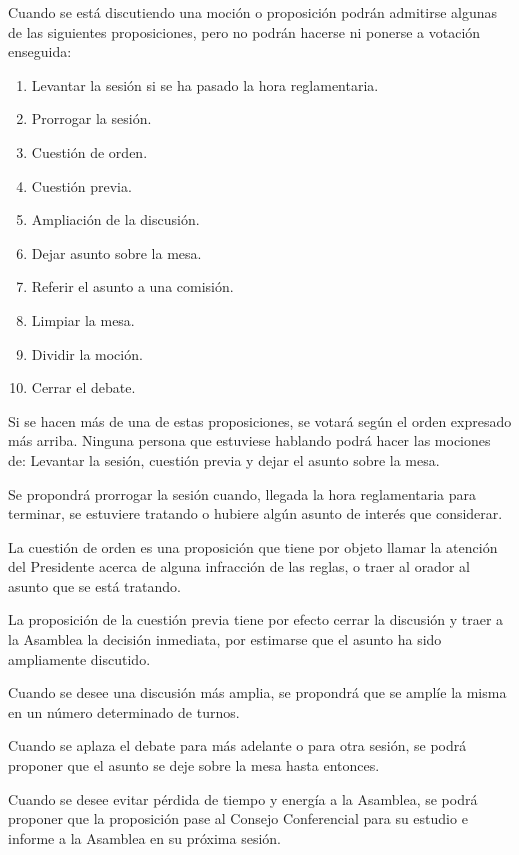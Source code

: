 \article
Cuando se está discutiendo una moción o proposición podrán admitirse algunas de las siguientes proposiciones, pero no podrán hacerse ni ponerse a votación enseguida:
\begin{enumerate}[label=\alph*),noitemsep]
    \item Levantar la sesión si se ha pasado la hora reglamentaria.
    \item Prorrogar la sesión.
    \item Cuestión de orden.
    \item Cuestión previa.
    \item Ampliación de la discusión.
    \item Dejar asunto sobre la mesa.
    \item Referir el asunto a una comisión.
    \item Limpiar la mesa.
    \item Dividir la moción.
    \item Cerrar el debate.
\end{enumerate}
Si se hacen más de una de estas proposiciones, se votará según el orden expresado más arriba. Ninguna persona que estuviese hablando podrá hacer las mociones de: Levantar la sesión, cuestión previa y dejar el asunto sobre la mesa.

\article
Se propondrá prorrogar la sesión cuando, llegada la hora reglamentaria para terminar, se estuviere tratando o hubiere algún asunto de interés que considerar.

\article
La cuestión de orden es una proposición que tiene por objeto llamar la atención del Presidente acerca de alguna infracción de las reglas, o traer al orador al asunto que se está tratando.

\article
La proposición de la cuestión previa tiene por efecto cerrar la discusión y traer a la Asamblea la decisión inmediata, por estimarse que el asunto ha sido ampliamente discutido.

\article
Cuando se desee una discusión más amplia, se propondrá que se amplíe la misma en un número determinado de turnos.

\article
Cuando se aplaza el debate para más adelante o para otra sesión, se podrá proponer que el asunto se deje sobre la mesa hasta entonces.

\article
Cuando se desee evitar pérdida de tiempo y energía a la Asamblea, se podrá proponer que la proposición pase al Consejo Conferencial para su estudio e informe a la Asamblea en su próxima sesión.

